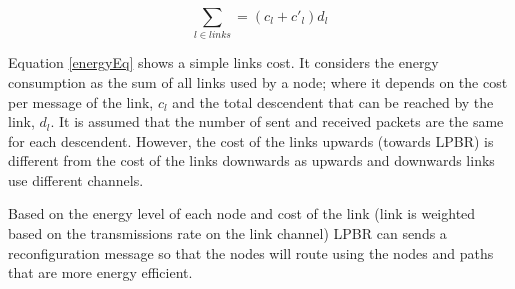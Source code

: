 \begin{equation}
\sum_{l \in links} = (c_{l} + c'_{l})d_{l}
\label{energyEq}
\end{equation}

Equation \ref{energyEq} shows a simple links cost. It considers the energy consumption as the sum of all links used by a node; where it depends on the cost per message of the link, $c_{l}$  and the total descendent that can be reached by the link, $d_{l}$. It is assumed that the number of sent and received packets are the same for each descendent. However, the cost of the links upwards (towards LPBR) is different from the cost of the links downwards as upwards and downwards links use different channels. 

Based on the energy level of each node and cost of the link (link is weighted based on the transmissions rate on the link channel) LPBR can sends a reconfiguration message so that the nodes will route using the nodes and paths that are more energy efficient.







